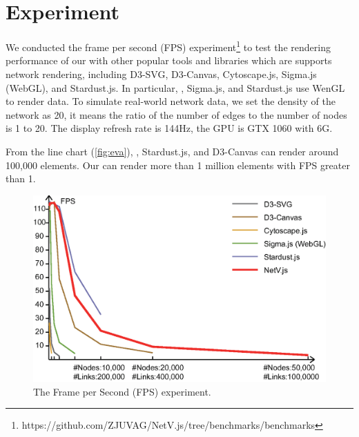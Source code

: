\section{Experiment}
We conducted the frame per second (FPS) experiment\footnote{https://github.com/ZJUVAG/NetV.js/tree/benchmarks/benchmarks} to test the rendering performance of our \name with other popular tools and libraries which are supports network rendering, including D3-SVG, D3-Canvas, Cytoscape.js, Sigma.js (WebGL), and Stardust.js. In particular, \name, Sigma.js, and Stardust.js use WenGL to render data. To simulate real-world network data, we set the density of the network as 20, it means the ratio of the number of edges to the number of nodes is 1 to 20. The display refresh rate is 144Hz, the GPU is GTX 1060 with 6G.


From the line chart (\autoref{fig:eva}), \name, Stardust.js, and D3-Canvas can render around 100,000 elements. Our \name can render more than 1 million elements with FPS greater than 1.

\begin{figure}[htbp]
    \includegraphics[width=\linewidth]{fig/eva.eps}
    \caption{
        The Frame per Second (FPS) experiment.
    }
    \label{fig:eva}
\end{figure}